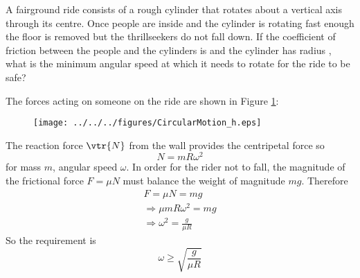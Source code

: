 
\begin{problem}
{A fairground ride consists of a rough cylinder that rotates about a vertical axis through its centre. Once people are inside and the cylinder is rotating fast enough the floor is removed but the thrillseekers do not fall down. If the coefficient of friction between the people and the cylinders is \vari{\mu} and the cylinder has radius , what is the minimum angular speed at which it needs to rotate for the ride to be safe?
}
{}
{The forces acting on someone on the ride are shown in Figure \ref{fig:CircularMotion_h}:
\begin{figure}[h]
\centering
\texttt{[image: ../../../figures/CircularMotion\_h.eps]}
\caption{}
\label{fig:CircularMotion_h}
\end{figure}
The reaction force $\vtr{N}$ from the wall provides the centripetal force so
\begin{equation*}
N=mR\omega^2
\end{equation*}
for mass $m$, angular speed $\omega$. In order for the rider not to fall, the magnitude of the frictional force $F=\mu N$ must balance the weight of magnitude $mg$. Therefore
\begin{align*}
F=\mu N=mg \\
\Rightarrow \mu mR\omega^2=mg \\
\Rightarrow \omega^2=\frac{g}{\mu R}
\end{align*}
So the requirement is 
\begin{equation*}
\omega\ge\sqrt{\frac{g}{\mu R}}
\end{equation*}
}
\end{problem}